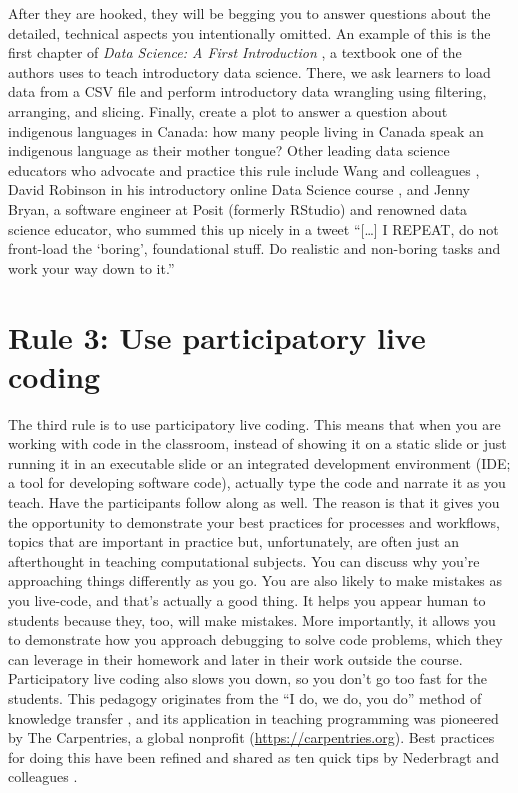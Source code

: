 \documentclass[
  10pt,
  letterpaper,
]{article}
\begin{document}
After they are hooked, they will be begging you to answer questions
about the detailed, technical aspects you intentionally omitted. An
example of this is the first chapter of \emph{Data Science: A First
Introduction} \citep{timbers2022data}, a textbook one of the authors
uses to teach introductory data science. There, we ask learners to load
data from a CSV file and perform introductory data wrangling using
filtering, arranging, and slicing. Finally, create a plot to answer a
question about indigenous languages in Canada: how many people living in
Canada speak an indigenous language as their mother tongue? Other
leading data science educators who advocate and practice this rule
include Wang and colleagues \citep{wang2017data}, David Robinson in his
introductory online Data Science course
\citep{robinson2017tidyverse, robinson2017announcing}, and Jenny Bryan,
a software engineer at Posit (formerly RStudio) and renowned data
science educator, who summed this up nicely in a tweet ``{[}\ldots{]} I
REPEAT, do not front-load the `boring', foundational stuff. Do realistic
and non-boring tasks and work your way down to it.''
\citep{bryan2017twitter}

\section{Rule 3: Use participatory live coding}\label{sec-rule3}

The third rule is to use participatory live coding. This means that when
you are working with code in the classroom, instead of showing it on a
static slide or just running it in an executable slide or an integrated
development environment (IDE; a tool for developing software code),
actually type the code and narrate it as you teach. Have the
participants follow along as well. The reason is that it gives you the
opportunity to demonstrate your best practices for processes and
workflows, topics that are important in practice but, unfortunately, are
often just an afterthought in teaching computational subjects. You can
discuss why you're approaching things differently as you go. You are
also likely to make mistakes as you live-code, and that's actually a
good thing. It helps you appear human to students because they, too,
will make mistakes. More importantly, it allows you to demonstrate how
you approach debugging to solve code problems, which they can leverage
in their homework and later in their work outside the course.
Participatory live coding also slows you down, so you don't go too fast
for the students. This pedagogy originates from the ``I do, we do, you
do'' method of knowledge transfer \citep{fisher2021better}, and its
application in teaching programming was pioneered by The Carpentries, a
global nonprofit (\url{https://carpentries.org}). Best practices for
doing this have been refined and shared as ten quick tips by Nederbragt
and colleagues \citep{nederbragt2020ten}.
\end{document}
